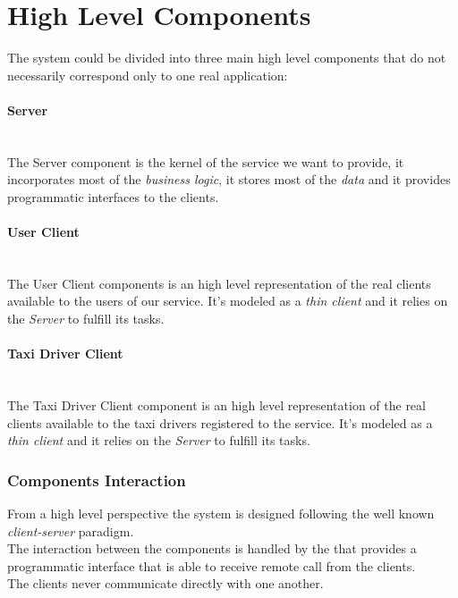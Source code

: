 \section{High Level Components} %
\label{sec:high_level_components}
The system could be divided into three main high level components that do not necessarily correspond only to one real application:
\paragraph{Server} %
\label{comp:server}\hfill \\
The Server component is the kernel of the service we want to provide, it incorporates most of the \emph{business logic}, it stores most of the \emph{data} and it provides programmatic interfaces to the clients.
\paragraph{User Client} %
\label{comp:user_client}\hfill \\
The User Client components is an high level representation of the real clients available to the users of our service. It's modeled as a \emph{thin client} and it relies on the \emph{Server} to fulfill its tasks.
\paragraph{Taxi Driver Client} %
\label{par:taxi_driver_client}\hfill \\
The Taxi Driver Client component is an high level representation of the real clients available to the taxi drivers registered to the service. It's modeled as a \emph{thin client} and it relies on the \emph{Server} to fulfill its tasks.


\subsubsection{Components Interaction} %
\label{ssub:components_interaction}
From a high level perspective the system is designed following the well known \emph{client-server} paradigm.\\
The interaction between the components is handled by the  that provides a programmatic interface that is able to receive remote call from the clients.\\
The clients never communicate directly with one another.
